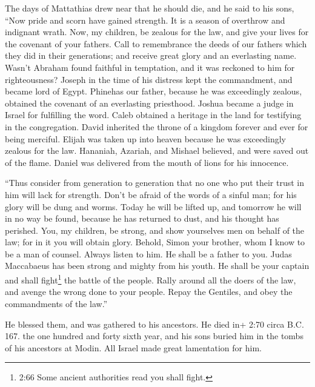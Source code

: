  The days of Mattathias drew near that he should die, and
he said to his sons, ``Now pride and scorn have gained strength. It is a
season of overthrow and indignant wrath.  Now, my children,
be zealous for the law, and give your lives for the covenant of your
fathers.  Call to remembrance the deeds of our fathers
which they did in their generations; and receive great glory and an
everlasting name.  Wasn't Abraham found faithful in
temptation, and it was reckoned to him for righteousness? 
Joseph in the time of his distress kept the commandment, and became lord
of Egypt.  Phinehas our father, because he was exceedingly
zealous, obtained the covenant of an everlasting priesthood.
 Joshua became a judge in Israel for fulfilling the word.
 Caleb obtained a heritage in the land for testifying in
the congregation.  David inherited the throne of a kingdom
forever and ever for being merciful.  Elijah was taken up
into heaven because he was exceedingly zealous for the law.
 Hananiah, Azariah, and Mishael believed, and were saved
out of the flame.  Daniel was delivered from the mouth of
lions for his innocence.

 ``Thus consider from generation to generation that no one
who put their trust in him will lack for strength.  Don't
be afraid of the words of a sinful man; for his glory will be dung and
worms.  Today he will be lifted up, and tomorrow he will in
no way be found, because he has returned to dust, and his thought has
perished.  You, my children, be strong, and show yourselves
men on behalf of the law; for in it you will obtain glory. 
Behold, Simon your brother, whom I know to be a man of counsel. Always
listen to him. He shall be a father to you.  Judas
Maccabaeus has been strong and mighty from his youth. He shall be your
captain and shall fight\footnote{2:66 Some ancient authorities read you
  shall fight.} the battle of the people.  Rally around all
the doers of the law, and avenge the wrong done to your people.
 Repay the Gentiles, and obey the commandments of the
law.''

 He blessed them, and was gathered to his ancestors.
 He died in+ 2:70 circa B.C. 167. the one hundred and forty
sixth year, and his sons buried him in the tombs of his ancestors at
Modin. All Israel made great lamentation for him.


